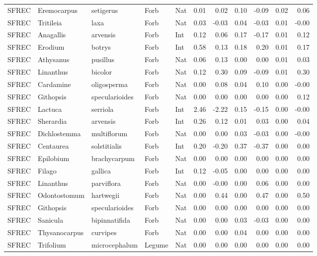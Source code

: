 \documentclass[twoside,12pt,final]{ucthesis-CA2012}
\begin{document}
\begin{ucmainmatter}
\begin{table}[ht]
{\begin{tabular}{lllllrrrrrr}
  SFREC & Eremocarpus & setigerus & Forb & Nat & 0.01 & 0.02 & 0.10 & -0.09 & 0.02 & 0.06 \\ 
  SFREC & Tritileia & laxa & Forb & Nat & 0.03 & -0.03 & 0.04 & -0.03 & 0.01 & -0.00 \\ 
  SFREC & Anagallis & arvensis & Forb & Int & 0.12 & 0.06 & 0.17 & -0.17 & 0.01 & 0.12 \\ 
  SFREC & Erodium & botrys & Forb & Int & 0.58 & 0.13 & 0.18 & 0.20 & 0.01 & 0.17 \\ 
  SFREC & Athysanus & pusillus & Forb & Nat & 0.06 & 0.13 & 0.00 & 0.00 & 0.01 & 0.03 \\ 
  SFREC & Linanthus & bicolor & Forb & Nat & 0.12 & 0.30 & 0.09 & -0.09 & 0.01 & 0.30 \\ 
  SFREC & Cardamine & oligosperma & Forb & Nat & 0.00 & 0.08 & 0.04 & 0.10 & 0.00 & -0.00 \\ 
  SFREC & Githopsis & specularioides & Forb & Nat & 0.00 & 0.00 & 0.00 & 0.00 & 0.00 & 0.12 \\ 
  SFREC & Lactuca & serriola & Forb & Int & 2.46 & -2.22 & 0.15 & -0.15 & 0.00 & -0.00 \\ 
  SFREC & Sherardia & arvensis & Forb & Int & 0.26 & 0.12 & 0.01 & 0.03 & 0.00 & 0.04 \\ 
  SFREC & Dichlostemma & multiflorum & Forb & Nat & 0.00 & 0.00 & 0.03 & -0.03 & 0.00 & -0.00 \\ 
  SFREC & Centaurea & solstitialis & Forb & Int & 0.20 & -0.20 & 0.37 & -0.37 & 0.00 & 0.00 \\ 
  SFREC & Epilobium & brachycarpum & Forb & Nat & 0.00 & 0.00 & 0.00 & 0.00 & 0.00 & 0.00 \\ 
  SFREC & Filago & gallica & Forb & Int & 0.12 & -0.05 & 0.00 & 0.00 & 0.00 & 0.00 \\ 
  SFREC & Linanthus & parviflora & Forb & Nat & 0.00 & -0.00 & 0.00 & 0.06 & 0.00 & 0.00 \\ 
  SFREC & Odontostomum & hartwegii & Forb & Nat & 0.00 & 0.44 & 0.00 & 0.47 & 0.00 & 0.50 \\ 
  SFREC & Githopsis & specularioides & Forb & Nat & 0.00 & 0.00 & 0.00 & 0.00 & 0.00 & 0.00 \\ 
  SFREC & Sanicula & bipinnatifida & Forb & Nat & 0.00 & 0.00 & 0.03 & -0.03 & 0.00 & 0.00 \\ 
  SFREC & Thysanocarpus & curvipes & Forb & Nat & 0.00 & 0.00 & 0.04 & 0.00 & 0.00 & 0.00 \\ 
  SFREC & Trifolium & microcephalum & Legume & Nat & 0.00 & 0.00 & 0.00 & 0.00 & 0.00 & 0.00 \\ 

\end{tabular}}
\end{table}
\end{ucmainmatter}
\end{document}
